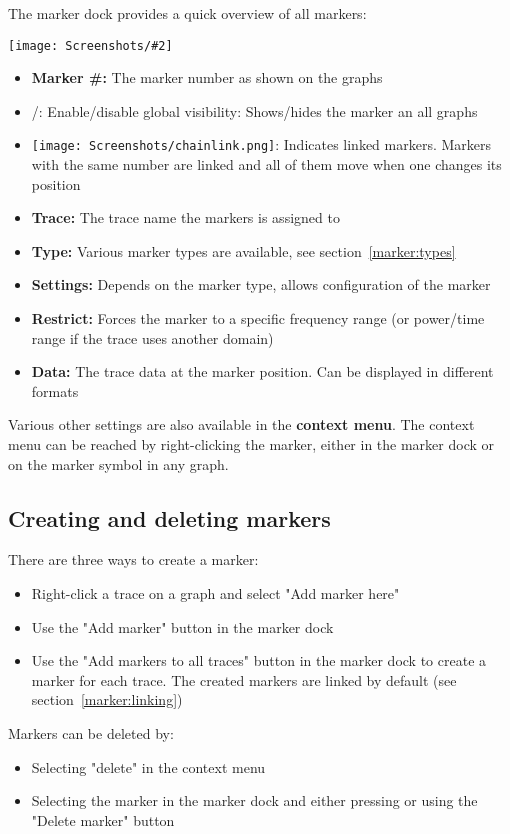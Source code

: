 \documentclass[a4paper,11pt]{article}
\newcommand{\screenshot}[2]{\begin{center}
\texttt{[image: Screenshots/\#2]}
\end{center}}
\begin{document}
The marker dock provides a quick overview of all markers:
\screenshot{1.0}{MarkerDock.png}
\begin{itemize}
\item \textbf{Marker \#:} The marker number as shown on the graphs
\item /: Enable/disable global visibility: Shows/hides the marker an all graphs
\item \texttt{[image: Screenshots/chainlink.png]}: Indicates linked markers. Markers with the same number are linked and all of them move when one changes its position
\item \textbf{Trace:} The trace name the markers is assigned to
\item \textbf{Type:} Various marker types are available, see section~\ref{marker:types}
\item \textbf{Settings:} Depends on the marker type, allows configuration of the marker
\item \textbf{Restrict:} Forces the marker to a specific frequency range (or power/time range if the trace uses another domain)
\item \textbf{Data:} The trace data at the marker position. Can be displayed in different formats
\end{itemize}

Various other settings are also available in the \textbf{context menu}. The context menu can be reached by right-clicking the marker, either in the marker dock or on the marker symbol in any graph.

\subsection{Creating and deleting markers}
There are three ways to create a marker:
\begin{itemize}
\item Right-click a trace on a graph and select "Add marker here"
\item Use the "Add marker" button in the marker dock
\item Use the "Add markers to all traces" button in the marker dock to create a marker for each trace. The created markers are linked by default (see section~\ref{marker:linking})
\end{itemize}
Markers can be deleted by:
\begin{itemize}
\item Selecting "delete" in the context menu
\item Selecting the marker in the marker dock and either pressing  or using the "Delete marker" button
\end{itemize}
\end{document}
